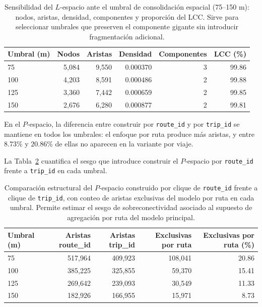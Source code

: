             \begin{table}[h!]
                \centering
                \caption{Sensibilidad del \(L\)-espacio ante el umbral de consolidación espacial (75--150 m): nodos, aristas, densidad, componentes y proporción del LCC. Sirve para seleccionar umbrales que preserven el componente gigante sin introducir fragmentación adicional.}
                \label{tab:sensibilidad_l_space}
                \begin{tabular}{lrrrrr}
                    \toprule
                    Umbral (m) & Nodos & Aristas & Densidad & Componentes & LCC (\%) \\
                    \midrule
                    75  & 5,084 & 9,550 & 0.000370 & 3 & 99.86 \\
                    100 & 4,203 & 8,591 & 0.000486 & 2 & 99.88 \\
                    125 & 3,360 & 7,442 & 0.000659 & 2 & 99.85 \\
                    150 & 2,676 & 6,280 & 0.000877 & 2 & 99.81 \\
                    \bottomrule
                \end{tabular}
            \end{table}

            En el \(P\)-espacio, la diferencia entre construir por \texttt{route\_id} y por \texttt{trip\_id} se mantiene en todos los umbrales: el enfoque por ruta produce más aristas, y entre \(8.73\%\) y \(20.86\%\) de ellas no aparecen en la variante por viaje.

            La Tabla~\ref{tab:sensibilidad_p_space_route_trip} cuantifica el sesgo que introduce construir el \(P\)-espacio por \texttt{route\_id} frente a \texttt{trip\_id} en cada umbral.

            \begin{table}[h!]
                \centering
                \caption{Comparación estructural del \(P\)-espacio construido por clique de \texttt{route\_id} frente a clique de \texttt{trip\_id}, con conteo de aristas exclusivas del modelo por ruta en cada umbral. Permite estimar el sesgo de sobreconectividad asociado al supuesto de agregación por ruta del modelo principal.}
                \label{tab:sensibilidad_p_space_route_trip}
                \begin{tabular}{lrrrr}
                    \toprule
                    Umbral (m) & Aristas route\_id & Aristas trip\_id & Exclusivas por ruta & Exclusivas por ruta (\%) \\
                    \midrule
                    75  & 517,964 & 409,923 & 108,041 & 20.86 \\
                    100 & 385,225 & 325,855 & 59,370  & 15.41 \\
                    125 & 269,642 & 239,093 & 30,549  & 11.33 \\
                    150 & 182,926 & 166,955 & 15,971  & 8.73 \\
                    \bottomrule
                \end{tabular}
            \end{table}

